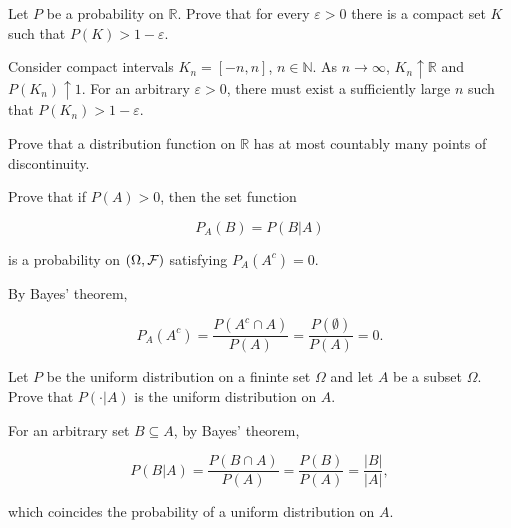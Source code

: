 \begin{exercise}
  Let $P$ be a probability on $\mathbb{R}$. Prove that for every $\varepsilon>0$ there is a compact set $K$ such that $P(K)>1-\varepsilon$.
\end{exercise}
\begin{solution}
  Consider compact intervals $K_n=[-n, n]$, $n\in\mathbb{N}$. As $n\to\infty$, $K_n\uparrow \mathbb{R}$ and $P(K_n)\uparrow 1$. For an arbitrary $\varepsilon>0$, there must exist a sufficiently large $n$ such that $P(K_n)>1-\varepsilon$.
\end{solution}

\begin{exercise}
  Prove that a distribution function on $\mathbb{R}$ has at most countably many points of discontinuity.
\end{exercise}
\begin{solution}
  [TODO]
\end{solution}


\begin{exercise}
  Prove that if $P(A)>0$, then the set function

  \[ P_A(B) = P(B|A) \]

  is a probability on $(\Omega, \cal F)$ satisfying $P_A(A^c)=0$.
\end{exercise}
\begin{solution}
  By Bayes' theorem,

  \[ P_A(A^c) = \frac{P(A^c\cap A)}{P(A)} = \frac{P(\emptyset)}{P(A)} = 0. \]
\end{solution}

\begin{exercise}
  Let $P$ be the uniform distribution on a fininte set $\Omega$ and let $A$ be a subset $\Omega$. Prove that $P(\cdot|A)$ is the uniform distribution on $A$.
\end{exercise}
\begin{solution}
  For an arbitrary set $B\subseteq A$, by Bayes' theorem,

  \[ P(B|A) = \frac{P(B\cap A)}{P(A)} = \frac{P(B)}{P(A)} = \frac{|B|}{|A|}, \]

  which coincides the probability of a uniform distribution on $A$.
\end{solution}


